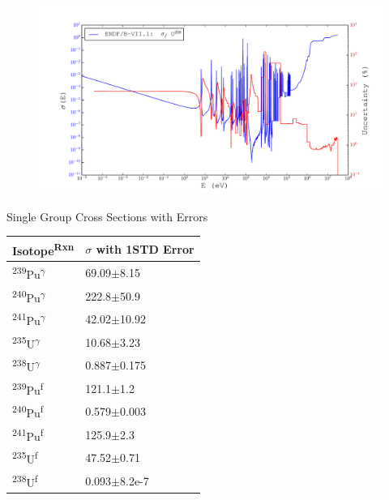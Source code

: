 \documentclass{beamer}
\newcommand\Tstrut{\rule{0pt}{2.6ex}}         %
\newcommand\Bstrut{\rule[-0.9ex]{0pt}{0pt}}   %
\newcommand{\tss}{\textsuperscript}
\begin{document}
\begin{frame}
  \begin{figure}[H]
    \begin{center}
      \hspace*{-0.7cm}\includegraphics[width=1.1\columnwidth]{../Weighting/X_Sections/XwVar_U_238_92_f.pdf}
      \vspace{-5mm}
      \label{fig:XU238}
    \end{center}
  \end{figure}
\end{frame}

\begin{frame}{Single Group Cross Sections with Errors}
  \begin{table}[H]
  \begin{center}
    \label{Table:4}
    \begin{tabular}{l l}
      \toprule
      Isotope\tss{Rxn} & $\sigma$ with 1STD Error\Tstrut\Bstrut\\
      \hline
      \tss{239}Pu\tss{$\gamma$} & 69.09$\pm$8.15\Tstrut\\
      \tss{240}Pu\tss{$\gamma$} & 222.8$\pm$50.9\\
      \tss{241}Pu\tss{$\gamma$} & 42.02$\pm$10.92\\
      \tss{235}U\tss{$\gamma$}  & 10.68$\pm$3.23\\
      \tss{238}U\tss{$\gamma$}  & 0.887$\pm$0.175\\
      \tss{239}Pu\tss{f} & 121.1$\pm$1.2 \\
      \tss{240}Pu\tss{f} & 0.579$\pm$0.003 \\
      \tss{241}Pu\tss{f} & 125.9$\pm$2.3 \\
      \tss{235}U\tss{f}  & 47.52$\pm$0.71 \\
      \tss{238}U\tss{f}  & 0.093$\pm$8.2e-7 \\
      \bottomrule
    \end{tabular}
  \end{center}
  \end{table}
\end{frame}
\end{document}

